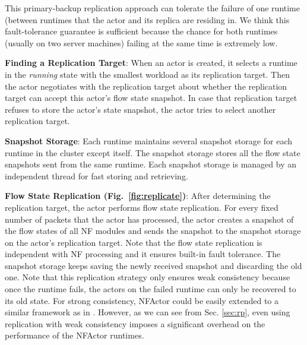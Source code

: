 This primary-backup replication approach can tolerate the failure of one runtime (between runtimes that the actor and its replica are residing in. %
We think this fault-tolerance guarantee is sufficient because the 
chance for both runtimes (usually on two server machines) failing at the same time is extremely low.

\textbf{Finding a Replication Target}: When an actor is created, it selects a runtime in the
\textit{running} state with the smallest workload as its replication
target. Then the actor negotiates with the replication target about whether the
replication target can accept this actor's flow state snapshot. In case that replication
target refuses to store the actor's state snapshot, the actor tries to select
another replication target. 

\textbf{Snapshot Storage}: Each runtime maintains several snapshot storage for each runtime in the cluster except itself. The snapshot storage stores all the flow state snapshots sent from the same runtime. Each snapshot storage is managed by an independent thread for fast storing and retrieving.

\textbf{Flow State Replication (Fig.~\ref{fig:replicate})}: After determining
the replication target, the actor performs flow state replication. For every fixed number of packets that the actor has processed, the actor creates a
snapshot of the flow states of all NF modules and sends the snapshot to the snapshot storage on the actor's replication target. Note that the flow state replication is independent with NF processing and it ensures built-in fault tolerance. The snapshot storage keeps saving the newly received snapshot and discarding the old one. Note that this replication strategy only ensures weak consistency because once the runtime fails, the actors on the failed runtime can only be recovered to its old state. For strong consistency, NFActor could be easily extended to a similar framework as in \cite{sherry2015rollback}. However, as we can see from Sec. \ref{sec:rp}, even using replication with weak consistency imposes a significant overhead on the performance of the NFActor runtimes.


